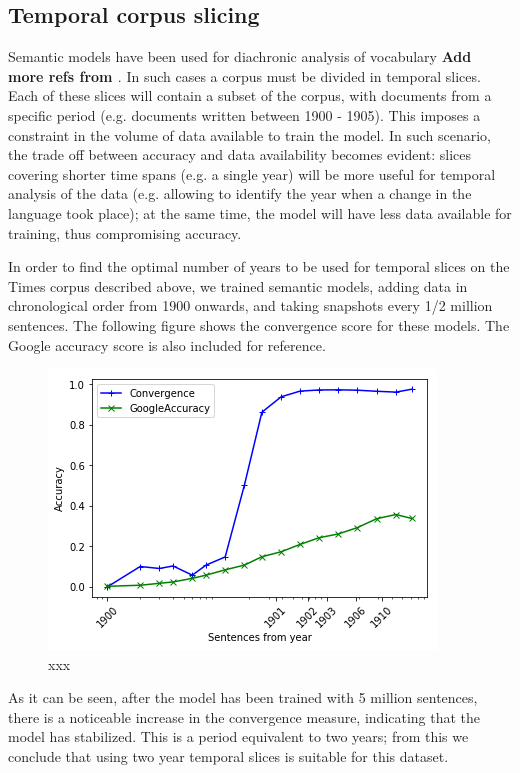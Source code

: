 \documentclass{article} %
\begin{document}
\subsection{Temporal corpus slicing}
\label{subsec:temporal_corpus_slicing}
Semantic models have been used for diachronic analysis of vocabulary \cite{Martinez_Histo2016,Hellrich_COLING2016} \textbf{Add more refs from \cite{Hellrich_COLING2016}}. In such cases a corpus must be divided in temporal slices. Each of these slices will contain a subset of the corpus, with documents from a specific period (e.g. documents written between 1900 - 1905). This imposes a constraint in the volume of data available to train the model. In such scenario, the trade off between accuracy and data availability becomes evident: slices covering shorter time spans (e.g. a single year) will be more useful for temporal analysis of the data (e.g. allowing to identify the year when a change in the language took place); at the same time, the model will have less data available for training, thus compromising accuracy.

In order to find the optimal number of years to be used for temporal slices on the Times corpus described above, we trained semantic models, adding data in chronological order from 1900 onwards, and taking snapshots every 1/2 million sentences. The following figure shows the convergence score for these models. The Google accuracy score is also included for reference.

\begin{figure}
 \includegraphics[scale=1]{figure3.png} 
 \caption{xxx}
 \label{fig:3}
\end{figure}

As it can be seen, after the model has been trained with 5 million sentences, there is a noticeable increase in the convergence measure, indicating that the model has stabilized. This is a period equivalent to two years; from this we conclude that using two year temporal slices is suitable for this dataset.
\end{document}
